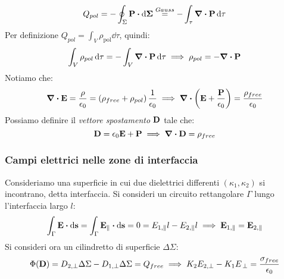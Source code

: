 \documentclass[12pt,a4paper]{article}
\begin{document}
\begin{equation*}
    Q_{pol} = -\oint_{\Sigma} \vb{P} \vdot \dd{\vb{\Sigma}} \overset{Gauss}{=} -\int_{\tau} \div \vb{P} \dd{\tau}
\end{equation*}
Per definizione \( Q_{pol} = \int_{V} \rho_{\text{pol}} \dd{\tau} \), quindi:
\begin{equation*}
    \int_{V} \rho_{pol} \dd{\tau} = -\int_{V} \div \vb{P} \dd{\tau}
    \implies \rho_{pol} = -\div \vb{P}
\end{equation*}
Notiamo che:
\begin{equation*}
    \div\vb{E}=\frac{\rho}{\epsilon_0}= \left( \rho_{free} +\rho_{pol} \right) \frac{1}{\epsilon_0}\implies \div(\vb{E}+\frac{\vb{P}}{\epsilon_0})= \frac{\rho_{free}}{\epsilon_0}
\end{equation*}
Possiamo definire il \textit{vettore spostamento} $\vb{D}$ tale che:
\begin{equation*}
    \vb{D}= \epsilon_0\vb{E} + \vb{P} \implies \div \vb{D} = \rho_{free}
\end{equation*}

\subsubsection{Campi elettrici nelle zone di interfaccia}
Consideriamo una superficie in cui due dielettrici differenti $(\kappa_1, \kappa_2)$ si incontrano, detta interfaccia. 
Si consideri un circuito rettangolare $\Gamma$ lungo l'interfaccia largo $l$:
\begin{equation*}
    \int_\Gamma \vb{E}\vdot\dd{\vb{s}}= \int_\Gamma \vb{E}_\parallel\vdot\dd{\vb{s}}= 0 = E_{1,\parallel}l-E_{2,\parallel}l \implies \vb{E}_{1,\parallel}= \vb{E}_{2,\parallel}
\end{equation*}
Si consideri ora un cilindretto di superficie $\Delta\Sigma$:
\begin{equation*}
    \Phi(\vb{D})= D_{2,\perp}\Delta\Sigma-D_{1,\perp}\Delta\Sigma = Q_{free}\implies K_2E_{2,\perp} -K_1E_{\,\perp}= \frac{\sigma_{free}}{\epsilon_0}
\end{equation*}
\end{document}
